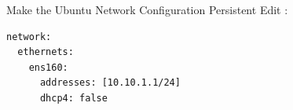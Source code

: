 \begin{frame}[fragile]{Make the Ubuntu Network Configuration Persistent}
  Edit :
  \begin{verbatim}
network:
  ethernets:
    ens160:
      addresses: [10.10.1.1/24]
      dhcp4: false
  \end{verbatim}
\end{frame}
